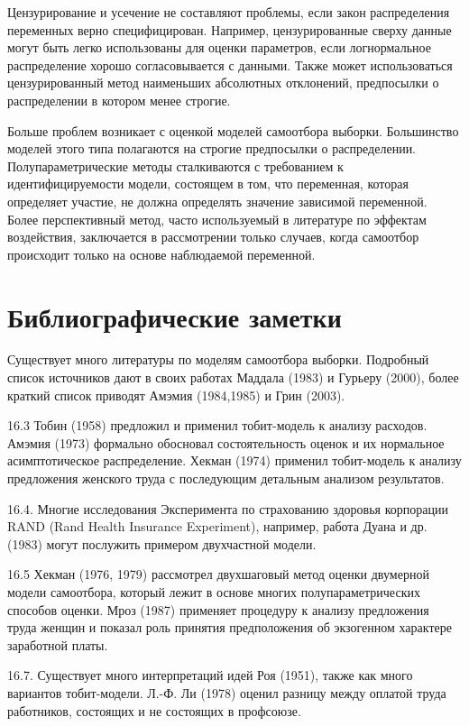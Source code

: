 Цензурирование и усечение не составляют проблемы, если закон распределения переменных верно специфицирован. Например, цензурированные сверху данные могут быть легко использованы для оценки параметров, если логнормальное распределение хорошо согласовывается с данными. Также может использоваться цензурированный метод наименьших абсолютных отклонений, предпосылки о распределении в котором менее строгие. 

Больше проблем возникает с оценкой моделей самоотбора выборки. Большинство моделей этого типа полагаются на строгие предпосылки о распределении. Полупараметрические методы сталкиваются с требованием к идентифицируемости модели, состоящем в том, что переменная, которая определяет участие, не должна определять значение зависимой переменной. Более перспективный метод, часто используемый в литературе по эффектам воздействия, заключается в рассмотрении только случаев, когда самоотбор происходит только  на основе  наблюдаемой переменной.

\section{Библиографические заметки}

Существует много литературы по моделям самоотбора выборки. Подробный список источников дают  в своих работах Маддала (1983) и Гурьеру (2000), более краткий список приводят Амэмия (1984,1985) и Грин (2003). 

16.3 Тобин (1958) предложил и применил тобит-модель к анализу расходов. Амэмия (1973) формально обосновал состоятельность оценок и их нормальное асимптотическое распределение. Хекман (1974) применил тобит-модель к анализу предложения женского труда с последующим детальным анализом результатов.

16.4. Многие исследования Эксперимента по страхованию здоровья корпорации RAND (Rand Health Insurance Experiment), например, работа Дуана и др. (1983) могут послужить примером двухчастной модели.

16.5 Хекман (1976, 1979) рассмотрел двухшаговый метод оценки двумерной модели самоотбора, который лежит в основе многих полупараметрических способов оценки. Мроз (1987) применяет процедуру к анализу предложения труда женщин и показал роль принятия предположения об экзогенном характере заработной платы.

16.7. Существует много интерпретаций идей Роя (1951), также как много вариантов тобит-модели. Л.-Ф. Ли (1978) оценил разницу между оплатой труда работников, состоящих и не состоящих в профсоюзе.

